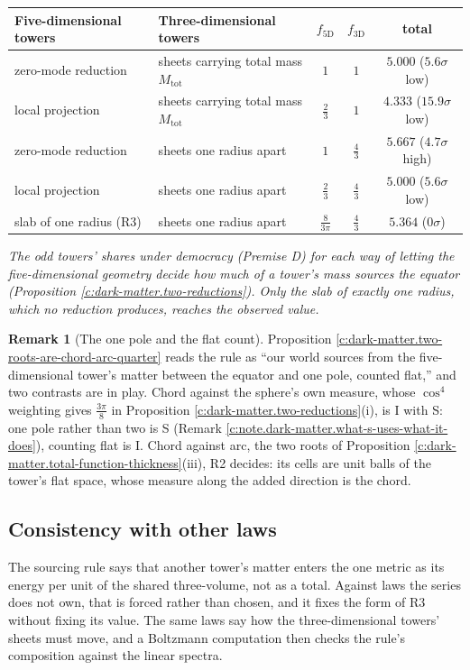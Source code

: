 \documentclass[11pt]{article}
\theoremstyle{definition}
\newtheorem{remark}[theorem]{Remark}
\theoremstyle{plain}
\newcommand{\changedmark}[2]{\marginpar{\raggedright\scriptsize\color{#1}#2}}
\begin{document}
\label{c:note.dark-matter.setting-what-could-fix-unit-de-4}
\centering \begin{tabular}{llccc}
\toprule
Five-dimensional towers & Three-dimensional towers & $f_{5\mathrm{D}}$ & $f_{3\mathrm{D}}$ & total \\
\midrule
zero-mode reduction & sheets carrying total mass $M_{\mathrm{tot}}$ & $1$ & $1$ & $5.000$ ($5.6\sigma$ low) \\[2pt]
local projection & sheets carrying total mass $M_{\mathrm{tot}}$ & $\tfrac{2}{3}$ & $1$ & $4.333$ ($15.9\sigma$ low) \\[2pt]
zero-mode reduction & sheets one radius apart & $1$ & $\tfrac{4}{3}$ & $5.667$ ($4.7\sigma$ high) \\[2pt]
local projection & sheets one radius apart & $\tfrac{2}{3}$ & $\tfrac{4}{3}$ & $5.000$ ($5.6\sigma$ low) \\[2pt]
slab of one radius (R3) & sheets one radius apart & $\tfrac{8}{3\pi}$ & $\tfrac{4}{3}$ & $5.364$ ($0\sigma$) \\[2pt]
\bottomrule
\end{tabular}

\emph{The odd towers' shares under democracy (Premise D) for each way of letting the five-dimensional geometry decide how much of a tower's mass sources the equator (Proposition \ref{c:dark-matter.two-reductions}). Only the slab of exactly one radius, which no reduction produces, reaches the observed value.}

\begin{remark}[The one pole and the flat count]\label{c:note.dark-matter.one-pole-flat-count}
\changedmark{BurntOrange}{changed since the deposit}
Proposition \ref{c:dark-matter.two-roots-are-chord-arc-quarter} reads the rule as ``our world sources from the five-dimensional tower's matter between the equator and one pole, counted flat,'' and two contrasts are in play. Chord against the sphere's own measure, whose $\cos^{4}$ weighting gives $\tfrac{3\pi}{8}$ in Proposition \ref{c:dark-matter.two-reductions}(i), is I with S: one pole rather than two is S (Remark \ref{c:note.dark-matter.what-s-uses-what-it-does}), counting flat is I. Chord against arc, the two roots of Proposition \ref{c:dark-matter.total-function-thickness}(iii), R2 decides: its cells are unit balls of the tower's flat space, whose measure along the added direction is the chord.
\end{remark}

\subsection*{Consistency with other laws}
\label{c:note.dark-matter.setting-consistency-other-laws}
The sourcing rule says that another tower's matter enters the one metric as its energy per unit of the shared three-volume, not as a total. Against laws the series does not own, that is forced rather than chosen, and it fixes the form of R3 without fixing its value. The same laws say how the three-dimensional towers' sheets must move, and a Boltzmann computation then checks the rule's composition against the linear spectra.
\end{document}
